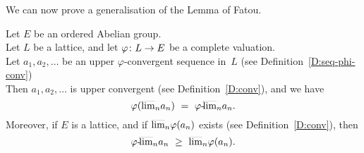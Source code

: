 \documentclass[main.tex]{subfiles}
\begin{document}
We can now prove a generalisation of the  Lemma of Fatou.
%
%
\begin{lem}[Fatou]
\label{L:fatou}
Let $E$ be an ordered Abelian group.\\
Let $L$ be a lattice,
and let $\varphi\colon L \rightarrow E$ be a 
complete valuation.\\
Let $a_1,a_2,\dotsc$ be an upper $\varphi$-convergent
sequence in~$L$
(see Definition~\ref{D:seq-phi-conv}) \\
Then $a_1,a_2,\dotsc$ is upper convergent
(see Definition~\ref{D:conv}),
and we have
\begin{equation*}
\varphi(\ulim{n}a_n) \ =\ 
\pulim\varphi{n} a_n.
\end{equation*}
Moreover,
if $E$ is a lattice, and
if $\smash{\overline{\lim}_{n}}\varphi(a_n)$ exists
(see Definition~\ref{D:conv}), then
\begin{equation*}
{\varphi}\text{-}\!\smash{\overline{\lim}_{n}}a_n
\ \geq\  
\smash{\overline{\lim}_{n}}\varphi(a_n) .
\end{equation*}
\end{lem}
\end{document}
